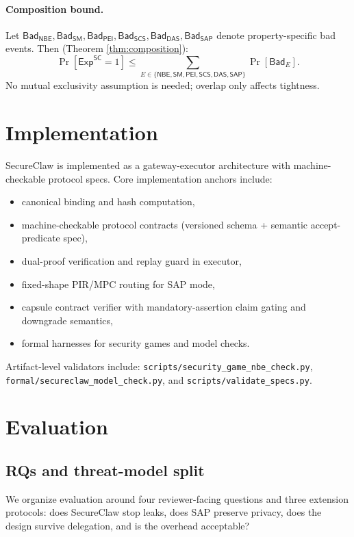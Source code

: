 \paragraph{Composition bound.}
Let $\mathsf{Bad}_{\mathsf{NBE}},\mathsf{Bad}_{\mathsf{SM}},\mathsf{Bad}_{\mathsf{PEI}},\mathsf{Bad}_{\mathsf{SCS}},\mathsf{Bad}_{\mathsf{DAS}},\mathsf{Bad}_{\mathsf{SAP}}$ denote property-specific bad events.
Then (Theorem \ref{thm:composition}):
\[
\Pr[\mathsf{Exp}^{\mathsf{SC}}=1]
\le
\sum_{E \in \{\mathsf{NBE},\mathsf{SM},\mathsf{PEI},\mathsf{SCS},\mathsf{DAS},\mathsf{SAP}\}}
\Pr[\mathsf{Bad}_E].
\]
No mutual exclusivity assumption is needed; overlap only affects tightness.

\section{Implementation}
\label{sec:impl}

SecureClaw is implemented as a gateway-executor architecture with machine-checkable protocol specs.
Core implementation anchors include:
\begin{itemize}
  \item canonical binding and hash computation,
  \item machine-checkable protocol contracts (versioned schema + semantic accept-predicate spec),
  \item dual-proof verification and replay guard in executor,
  \item fixed-shape PIR/MPC routing for SAP mode,
  \item capsule contract verifier with mandatory-assertion claim gating and downgrade semantics,
  \item formal harnesses for security games and model checks.
\end{itemize}

Artifact-level validators include:
\texttt{scripts/security\_game\_nbe\_check.py},
\texttt{formal/secureclaw\_model\_check.py},
and
\texttt{scripts/validate\_specs.py}.

\section{Evaluation}
\label{sec:eval}

\subsection{RQs and threat-model split}

We organize evaluation around four reviewer-facing questions and three extension protocols: does SecureClaw stop leaks, does SAP preserve privacy, does the design survive delegation, and is the overhead acceptable?

